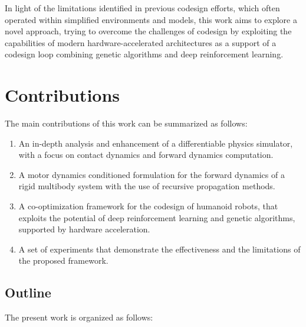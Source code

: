 In light of the limitations identified in previous codesign efforts, which often operated within simplified environments and models, this work aims to explore a novel approach, trying to overcome the challenges of codesign by exploiting the capabilities of modern hardware-accelerated architectures as a support of a codesign loop combining genetic algorithms and deep reinforcement learning.

\section*{Contributions}

The main contributions of this work can be summarized as follows:

\begin{enumerate}
    \item An in-depth analysis and enhancement of a differentiable physics simulator, with a focus on contact dynamics and forward dynamics computation.
    \item A motor dynamics conditioned formulation for the forward dynamics of a rigid multibody system with the use of recursive propagation methods.
    \item A co-optimization framework for the codesign of humanoid robots, that exploits the potential of deep reinforcement learning and genetic algorithms, supported by hardware acceleration.
    \item A set of experiments that demonstrate the effectiveness and the limitations of the proposed framework.
\end{enumerate}


\subsection*{Outline}

The present work is organized as follows:

